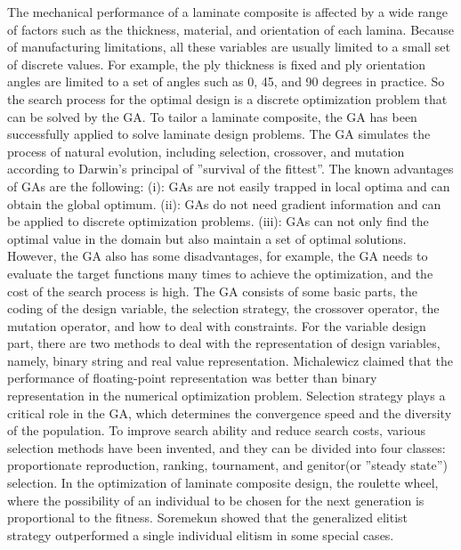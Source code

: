 \documentclass[USenglish,twocolumn]{article}
\begin{document}
The mechanical performance of a laminate composite is affected by a wide range of factors such as the
thickness, material, and orientation of each lamina. Because of manufacturing limitations, all these
variables are usually limited to a small set of discrete values. For example, the ply thickness is fixed
and ply orientation angles are limited to a set of angles such as 0, 45, and 90 degrees in practice. So
the search process for the optimal design is a discrete optimization problem that can be solved by the
GA. To tailor a laminate composite, the GA has been successfully applied to solve laminate design
problems\cite{riche1993optimization,nagendra1996improved,sadagopan1998application,todoroki1998stacking,liu2000permutation,sivakumar1998optimum,walker2003technique,lin2004stacking,kang2005minimum,murugan2007target,akbulut2008optimum}.
The GA simulates the process of natural evolution, including selection, crossover, and mutation
according to Darwin's principal of ''survival of the fittest''. The known advantages of GAs are the
following: (i): GAs are not easily trapped in local optima and can obtain the global
optimum. (ii): GAs do not need gradient information and can be applied to discrete optimization
problems. (iii): GAs can not only find the optimal value in the domain but also maintain a
set of optimal solutions. However, the GA also has some disadvantages, for example, the GA
needs to evaluate the target functions many times to achieve the optimization, and the cost of the
search process is high. The GA consists of some basic parts, the coding of the design variable,
the selection strategy, the crossover operator, the mutation operator, and how to deal with constraints. For the
variable design part, there are two methods to deal with the representation of design variables, namely,
binary string and real value representation\cite{riche1993optimization,todoroki1998stacking}.
Michalewicz\cite{zbigniew1996genetic} claimed that the performance of floating-point representation was
better than binary representation in the numerical optimization problem. Selection strategy plays a
critical role in the GA, which determines the convergence speed and the diversity of the population. To
improve search ability and reduce search costs, various selection methods have been invented, and they
can be divided into four classes: proportionate reproduction, ranking, tournament, and
genitor(or ''steady state'') selection. In the optimization of laminate composite design, the roulette
wheel\cite{riche1993optimization,seresta2007optimal}, where the possibility of an individual to be
chosen for the next generation is proportional to the fitness.
Soremekun\cite{soremekun2001composite} showed that the generalized elitist strategy outperformed a
single individual elitism in some special cases.
\end{document}

